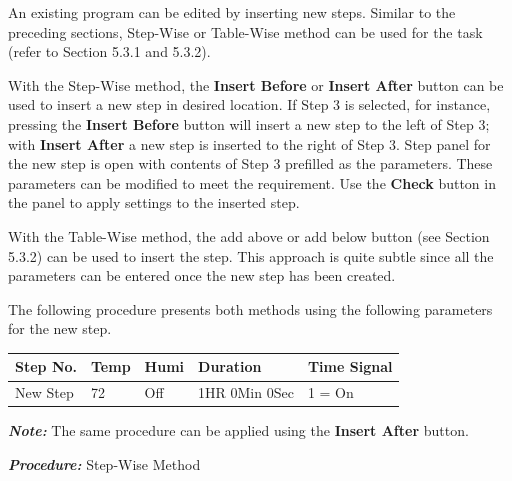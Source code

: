 An existing program can be edited by inserting new steps. Similar to the
preceding sections, Step-Wise or Table-Wise method can be used for the
task (refer to Section 5.3.1 and 5.3.2).

With the Step-Wise method, the \textbf{Insert Before} or \textbf{Insert
After} button can be used to insert a new step in desired location. If
Step 3 is selected, for instance, pressing the \textbf{Insert Before}
button will insert a new step to the left of Step 3; with \textbf{Insert
After} a new step is inserted to the right of Step 3. Step panel for the
new step is open with contents of Step 3 prefilled as the parameters.
These parameters can be modified to meet the requirement. Use the
\textbf{Check} button in the panel to apply settings to the inserted
step.

With the Table-Wise method, the add above or add below button (see
Section 5.3.2) can be used to insert the step. This approach is quite
subtle since all the parameters can be entered once the new step has
been created.

The following procedure presents both methods using the following
parameters for the new step.

\begin{longtable}[]{@{}lllll@{}}
\toprule
Step No. & Temp & Humi & Duration & Time Signal\tabularnewline
\midrule
\endhead
New Step & 72 & Off & 1HR 0Min 0Sec & 1 = On\tabularnewline
\bottomrule
\end{longtable}

\textbf{\emph{Note:}} The same procedure can be applied using the
\textbf{Insert After} button.

\pagebreak 

\textbf{\emph{Procedure:}} Step-Wise Method

